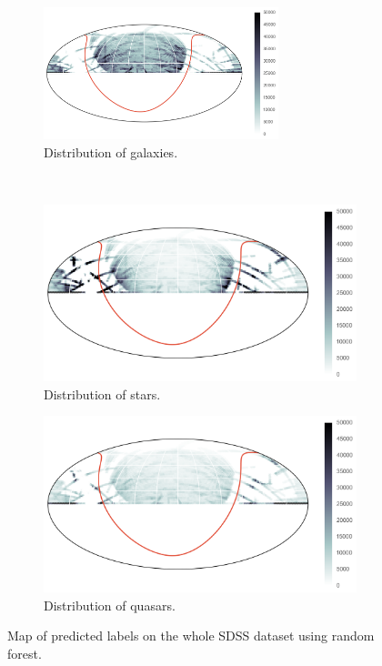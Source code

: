 \begin{figure}[p]
	\centering
	\begin{subfigure}{\textwidth}
		\centering
		\includegraphics[width=0.75\textwidth]{figures/4_expt1/map_prediction_forest_galaxies}
		\caption{Distribution of galaxies.}
		\label{fig:random1}
	\end{subfigure}\\
	\begin{subfigure}{\textwidth}
		\centering
		\includegraphics[width=0.75\linewidth]{figures/4_expt1/map_prediction_forest_stars}
		\caption{Distribution of stars.}
		\label{fig:random2}
	\end{subfigure}
	\begin{subfigure}{\textwidth}
		\centering
		\includegraphics[width=0.75\linewidth]{figures/4_expt1/map_prediction_forest_quasars}
		\caption{Distribution of quasars.}
		\label{fig:random3}
	\end{subfigure}
	\caption[Map of predicted labels on the whole SDSS dataset using random forest.]{
		Map of predicted labels on the whole SDSS dataset using random forest.}
	\label{fig:forest}
\end{figure}


